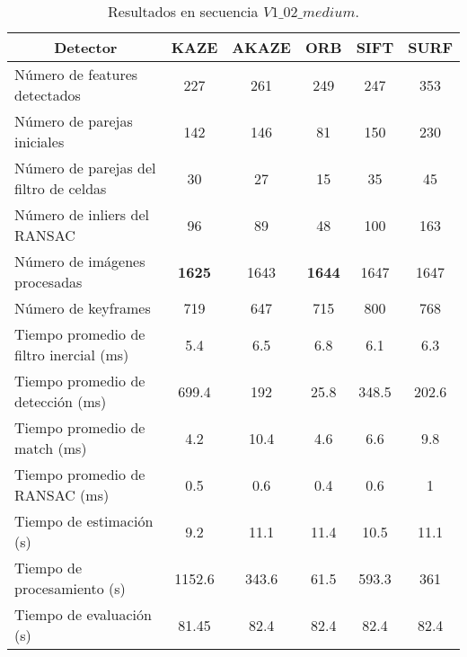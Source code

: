 \begin{table}[H]
	\caption{Resultados  en secuencia $V1\_02\_medium$.}
	\begin{tabular}{|l|c|c|c|c|c|}
		\hline
		\multicolumn{1}{|c|}{\textbf{Detector}} & \textbf{KAZE} & \textbf{AKAZE} & \textbf{ORB} & \textbf{SIFT} & \textbf{SURF} \\ \hline
		Número de features detectados & 227 & 261 & 249 & 247 & 353 \\ \hline
		Número de parejas iniciales & 142 & 146 & 81 & 150 & 230 \\ \hline
		Número de parejas del filtro de celdas & 30 & 27 & 15 & 35 & 45 \\ \hline
		Número de inliers del RANSAC & 96 & 89 & 48 & 100 & 163 \\ \hline
		Número de imágenes procesadas & \textbf{1625} & 1643 & \textbf{1644} & 1647 & 1647 \\ \hline
		Número de keyframes & 719 & 647 & 715 & 800 & 768 \\ \hline
		Tiempo promedio de filtro inercial (ms) & 5.4 & 6.5 & 6.8 & 6.1 & 6.3 \\ \hline
		Tiempo promedio de detección  (ms) & 699.4 & 192 & 25.8 & 348.5 & 202.6 \\ \hline
		Tiempo promedio de match (ms) & 4.2 & 10.4 & 4.6 & 6.6 & 9.8 \\ \hline
		Tiempo promedio de RANSAC (ms) & 0.5 & 0.6 & 0.4 & 0.6 & 1 \\ \hline
		Tiempo de estimación (s) & 9.2 & 11.1 & 11.4 & 10.5 & 11.1 \\ \hline
		Tiempo de  procesamiento (s) & 1152.6 & 343.6 & 61.5 & 593.3 & 361 \\ \hline
		Tiempo de evaluación (s) & 81.45 & 82.4 & 82.4 & 82.4 & 82.4 \\ \hline
	\end{tabular}
	\label{Tabla/Resultados/V1_02_medium}
\end{table}
%
%
%
%
%
%
%
%
%


